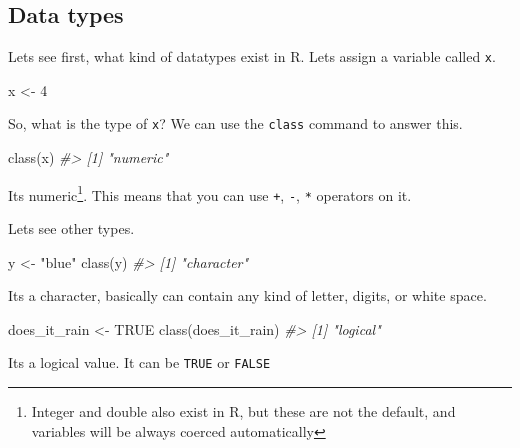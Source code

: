 \documentclass[
]{article}
\newenvironment{Shaded}{\begin{snugshade}}{\end{snugshade}}
\newcommand{\CommentTok}[1]{\textcolor[rgb]{0.56,0.35,0.01}{\textit{#1}}}
\newcommand{\ConstantTok}[1]{\textcolor[rgb]{0.00,0.00,0.00}{#1}}
\newcommand{\DecValTok}[1]{\textcolor[rgb]{0.00,0.00,0.81}{#1}}
\newcommand{\FunctionTok}[1]{\textcolor[rgb]{0.00,0.00,0.00}{#1}}
\newcommand{\NormalTok}[1]{#1}
\newcommand{\OtherTok}[1]{\textcolor[rgb]{0.56,0.35,0.01}{#1}}
\newcommand{\StringTok}[1]{\textcolor[rgb]{0.31,0.60,0.02}{#1}}
\begin{document}
\hypertarget{data-types}{%
\subsection{Data types}\label{data-types}}

Lets see first, what kind of datatypes exist in R. Lets assign a variable called \texttt{x}.

\begin{Shaded}
\begin{Highlighting}[]
\NormalTok{x }\OtherTok{\textless{}{-}} \DecValTok{4}
\end{Highlighting}
\end{Shaded}

So, what is the type of \texttt{x}? We can use the \texttt{class} command to answer this.

\begin{Shaded}
\begin{Highlighting}[]
\FunctionTok{class}\NormalTok{(x)}
\CommentTok{\#\textgreater{} [1] "numeric"}
\end{Highlighting}
\end{Shaded}

Its numeric\footnote{Integer and double also exist in R, but these are not the default, and variables will be always coerced automatically}. This means that you can use \texttt{+}, \texttt{-}, \texttt{*} operators on it.

Lets see other types.

\begin{Shaded}
\begin{Highlighting}[]
\NormalTok{y }\OtherTok{\textless{}{-}} \StringTok{"blue"}
\FunctionTok{class}\NormalTok{(y)}
\CommentTok{\#\textgreater{} [1] "character"}
\end{Highlighting}
\end{Shaded}

Its a character, basically can contain any kind of letter, digits, or white space.

\begin{Shaded}
\begin{Highlighting}[]
\NormalTok{does\_it\_rain }\OtherTok{\textless{}{-}} \ConstantTok{TRUE}
\FunctionTok{class}\NormalTok{(does\_it\_rain)}
\CommentTok{\#\textgreater{} [1] "logical"}
\end{Highlighting}
\end{Shaded}

Its a logical value. It can be \texttt{TRUE} or \texttt{FALSE}
\end{document}
